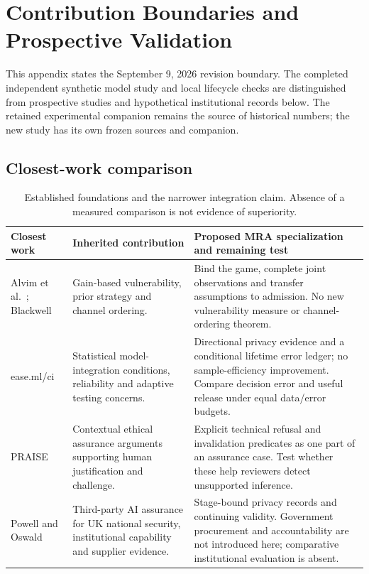 \section{Contribution Boundaries and Prospective Validation}
\label{app:revision-boundaries}
This appendix states the September 9, 2026 revision boundary. The completed
independent synthetic model study and local lifecycle checks are distinguished
from prospective studies and hypothetical institutional records below.
The retained experimental companion remains the source of historical numbers;
the new study has its own frozen sources and companion.

\subsection{Closest-work comparison}
\begin{table}[t]
\centering\footnotesize
\caption{Established foundations and the narrower integration claim. Absence
of a measured comparison is not evidence of superiority.}
\label{tab:closest-work}
\begin{tabularx}{\textwidth}{@{}p{}XX@{}}
\toprule
Closest work & Inherited contribution & Proposed MRA specialization and remaining test \\
\midrule
Alvim et al.\ \citep{alvim2012gain}; Blackwell \citep{blackwell1953experiments} & Gain-based vulnerability, prior strategy and channel ordering. & Bind the game, complete joint observations and transfer assumptions to admission. No new vulnerability measure or channel-ordering theorem. \\
ease.ml/ci \citep{renggli2019easeml} & Statistical model-integration conditions, reliability and adaptive testing concerns. & Directional privacy evidence and a conditional lifetime error ledger; no sample-efficiency improvement. Compare decision error and useful release under equal data/error budgets. \\
PRAISE \citep{porter2024praise} & Contextual ethical assurance arguments supporting human justification and challenge. & Explicit technical refusal and invalidation predicates as one part of an assurance case. Test whether these help reviewers detect unsupported inference. \\
Powell and Oswald \citep{powell2024assurance} & Third-party AI assurance for UK national security, institutional capability and supplier evidence. & Stage-bound privacy records and continuing validity. Government procurement and accountability are not introduced here; comparative institutional evaluation is absent. \\

\end{tabularx}
\end{table}
